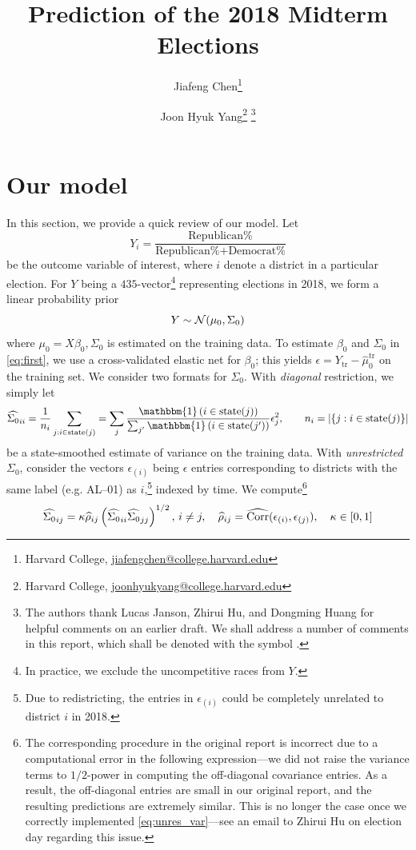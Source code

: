 \documentclass[12pt]{article}
\title{\sffamily\bfseries{Prediction of the 2018 Midterm Elections}}
\author{Jiafeng Chen\thanks{Harvard College, \url{jiafengchen@college.harvard.edu}} \and Joon Hyuk Yang\thanks{Harvard College, \url{joonhyukyang@college.harvard.edu}}\,\,\thanks{The authors thank Lucas Janson, Zhirui Hu, and Dongming Huang for helpful comments on an earlier draft. We shall address a number of comments in this report, which shall be denoted with the symbol \cm.}}
\newcommand{\one}{\mathbbm{1}}
\begin{document}
\section{Our model}

In this section, we provide a quick review of our model. Let \begin{equation}
  Y_i = \frac{\text{Republican\%}}{\text{Republican\%}+\text{Democrat\%}}
  \label{eq:def_y}
\end{equation}
be the outcome variable of interest, where $i$ denote a district in a particular election. For $Y$ being a $435$-vector\footnote{In practice, we exclude the uncompetitive races from $Y$.} representing elections in 2018, we form a linear probability prior \begin{equation}
  Y \sim \mathcal{N}(\mu_0, \Sigma_0)\label{eq:first}
\end{equation}
where $\mu_0 = X\beta_0, \Sigma_0$ is estimated
on the training data. To estimate $\beta_0$ and $\Sigma_0$ in \eqref{eq:first}, we use a cross-validated elastic net for $\beta_0$; this yields $\epsilon = Y_{\text{tr}} - \hat \mu_0^{\text{tr}}$ on the training set. We consider two formats for $\Sigma_0$. With \emph{diagonal} restriction, we simply let 
\begin{equation}
  \hat {\Sigma_0}_{ii} = \frac{1}{n_i} \sum_{j : i\in\text{state}(j)} = \sum_j \frac{\one\pr{i\in\text{state}(j)}}{\sum_{j'} \one\pr{i\in\text{state}(j')}} \epsilon_j^2, \qquad n_i = |\{j : i\in\text{state}(j)\}|
\label{eq:diag_var}
\end{equation}
be a state-smoothed estimate of variance on the training data. With \emph{unrestricted} $\Sigma_0$, consider the vectors $\epsilon_{(i)}$ being $\epsilon$ entries corresponding to districts with the same label (e.g. AL--01) as $i$,\footnote{Due to redistricting, the entries in $\epsilon_{(i)}$ could be completely unrelated to district $i$ in 2018.} indexed by time. We compute\footnote{The corresponding procedure in the original report is incorrect due to a computational error in the following expression---we did not raise the variance terms to $1/2$-power in computing the off-diagonal covariance entries. As a result, the off-diagonal entries are small in our original report, and the resulting predictions are extremely similar. This is no longer the case once we correctly implemented \eqref{eq:unres_var}---see an email to Zhirui Hu on election day regarding this issue.} \begin{equation}
  \widehat{\Sigma_0}_{ij} = \kappa \widehat \rho_{ij} \left({\widehat {\Sigma_0}_{ii} \widehat {\Sigma_0}_{jj}}\right)^{1/2},\, i\neq j,\quad \widehat \rho_{ij} = \widehat{\operatorname{Corr}}(\epsilon_{(i)}, \epsilon_{(j)}), \quad \kappa\in [0,1]
\label{eq:unres_var}
\end{equation}
\end{document}
